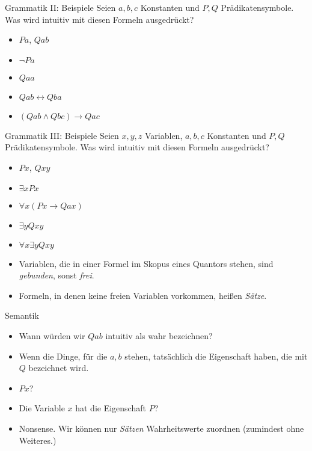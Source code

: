 \documentclass[12pt]{beamer}
\begin{document}
\begin{frame}{Grammatik II: Beispiele}
  Seien $a,b,c$ Konstanten und $P,Q$ Prädikatensymbole. Was wird
  intuitiv mit diesen Formeln ausgedrückt?

  \begin{itemize}
  \item<2-> $Pa$, $Qab$
  \item<3-> $\neg Pa$
  \item<4-> $Qaa$
  \item<5-> $Qab \leftrightarrow Qba$
  \item<6-> $(Qab \land Qbc) \to Qac$
  \end{itemize}

\end{frame}

\begin{frame}{Grammatik III: Beispiele}
  Seien $x, y, z$ Variablen, $a,b,c$ Konstanten und $P,Q$
  Prädikatensymbole. Was wird intuitiv mit diesen Formeln ausgedrückt?

  \begin{itemize}
  \item<2-> $Px$, $Qxy$
  \item<3-> $\exists x Px$
  \item<4-> $\forall x (Px \to Qax)$
  \item<5-> $\exists y Qxy$
  \item<6-> $\forall x \exists y Qxy$
  \end{itemize}

  \begin{itemize}
  \item<7-> Variablen, die in einer Formel im Skopus eines Quantors
    stehen, sind \emph{gebunden}, sonst \emph{frei}.
  \item<8-> Formeln, in denen keine freien Variablen vorkommen, heißen
    \emph{Sätze}.
  \end{itemize}
\end{frame}

\begin{frame}{Semantik}
  \begin{itemize}[<+->]
  \item Wann würden wir $Qab$ intuitiv als wahr bezeichnen?

  \item Wenn die Dinge, für die $a,b$ stehen, tatsächlich die
    Eigenschaft haben, die mit $Q$ bezeichnet wird.
  \item $Px$?

  \item Die Variable $x$ hat die Eigenschaft $P$?
  \item Nonsense. Wir können nur \emph{Sätzen} Wahrheitswerte zuordnen
    (zumindest ohne Weiteres.)
  \end{itemize}
\end{frame}
\end{document}
